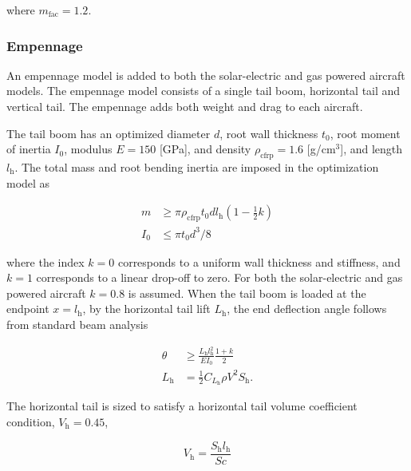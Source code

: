 where $m_{\text{fac}} = 1.2$.


\subsubsection{Empennage}

An empennage model is added to both the solar-electric and gas powered aircraft models.  The empennage model consists of a single tail boom, horizontal tail and vertical tail.  
The empennage adds both weight and drag to each aircraft.  

The tail boom has an optimized diameter $d$, root wall thickness $t_0$, root moment of inertia $I_0$, modulus $E=150$ [GPa]\cite{cfprop}, and density $\rho_{\text{cfrp}} = 1.6$ [g/cm$^3$]\cite{cfprop}, and length $l_{\text{h}}$. 
The total mass and root bending inertia are imposed in the optimization model as 

\begin{align}
    m &\geq \pi \rho_{\text{cfrp}} t_0 d l_{\text{h}} \left( 1 - \frac{1}{2} k\right) \\
    I_0 &\leq \pi t_0 d^3/8
\end{align}

where the index $k=0$ corresponds to a uniform wall thickness and stiffness, and $k=1$ corresponds to a linear drop-off to zero.  For both the solar-electric and gas powered aircraft $k=0.8$ is assumed.  
When the tail boom is loaded at the endpoint $x=l_{\text{h}}$, by the horizontal tail lift $L_{\text{h}}$, the end deflection angle follows from standard beam analysis

\begin{align}
    \label{e:boomdefl}
    \theta &\geq \frac{L_{\text{h}} l_{\text{h}}^2}{EI_0} \frac{1+k}{2} \\
    L_{\text{h}} &= \frac{1}{2} C_{L_{\text{h}}} \rho V^2 S_{\text{h}}.
\end{align}

The horizontal tail is sized to satisfy a horizontal tail volume coefficient condition, $V_{\text{h}} = 0.45$,\cite{aircraftrules}

\begin{equation}
    V_{\text{h}} = \frac{S_{\text{h}}l_{\text{h}}}{Sc}
\end{equation}

